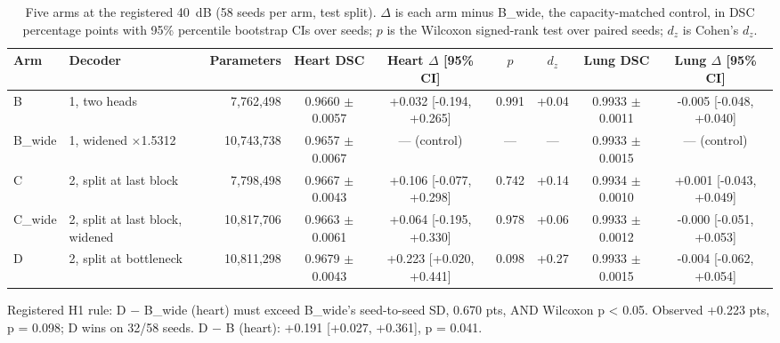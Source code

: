 \begin{table}[t]
\centering
\caption{Five arms at the registered 40~dB (58 seeds per arm, test split). $\Delta$ is each arm minus B\_wide, the capacity-matched control, in DSC percentage points with 95\% percentile bootstrap CIs over seeds; $p$ is the Wilcoxon signed-rank test over paired seeds; $d_z$ is Cohen's $d_z$.}
\label{tab:arms40}
\begin{tabular}{llrcccccc}
\toprule
Arm & Decoder & Parameters & Heart DSC & Heart $\Delta$ [95\% CI] & $p$ & $d_z$ & Lung DSC & Lung $\Delta$ [95\% CI] \\
\midrule
B & 1, two heads & 7,762,498 & 0.9660 $\pm$ 0.0057 & +0.032 [-0.194, +0.265] & 0.991 & +0.04 & 0.9933 $\pm$ 0.0011 & -0.005 [-0.048, +0.040] \\
B\_wide & 1, widened $\times$1.5312 & 10,743,738 & 0.9657 $\pm$ 0.0067 & --- (control) & --- & --- & 0.9933 $\pm$ 0.0015 & --- (control) \\
C & 2, split at last block & 7,798,498 & 0.9667 $\pm$ 0.0043 & +0.106 [-0.077, +0.298] & 0.742 & +0.14 & 0.9934 $\pm$ 0.0010 & +0.001 [-0.043, +0.049] \\
C\_wide & 2, split at last block, widened & 10,817,706 & 0.9663 $\pm$ 0.0061 & +0.064 [-0.195, +0.330] & 0.978 & +0.06 & 0.9933 $\pm$ 0.0012 & -0.000 [-0.051, +0.053] \\
D & 2, split at bottleneck & 10,811,298 & 0.9679 $\pm$ 0.0043 & +0.223 [+0.020, +0.441] & 0.098 & +0.27 & 0.9933 $\pm$ 0.0015 & -0.004 [-0.062, +0.054] \\
\bottomrule
\end{tabular}
\begin{tablenotes}\small\item Registered H1 rule: D $-$ B\_wide (heart) must exceed B\_wide's seed-to-seed SD, 0.670 pts, AND Wilcoxon p < 0.05. Observed +0.223 pts, p = 0.098; D wins on 32/58 seeds. D $-$ B (heart): +0.191 [+0.027, +0.361], p = 0.041.\end{tablenotes}
\end{table}
